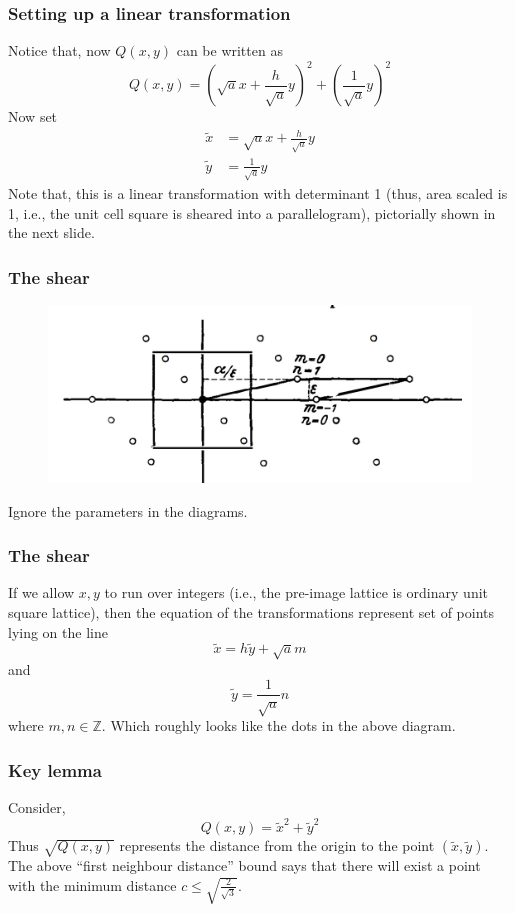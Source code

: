 \documentclass{beamer}
\begin{document}
    \begin{frame}
        \frametitle{Setting up a linear transformation}
        Notice that, now \(Q(x,y)\) can be written as \[Q(x,y) = \left(\sqrt{a}x + \frac{h}{\sqrt{a}}y\right)^2 + \left(\frac{1}{\sqrt{a}}y\right)^2\]
        Now set 
        \begin{align*}
            \tilde{x} &= \sqrt{a}x + \frac{h}{\sqrt{a}}y \\
            \tilde{y} &= \frac{1}{\sqrt{a}}y
        \end{align*}
        Note that, this is a linear transformation with determinant 1 (thus, area scaled is 1, i.e., the unit cell square is sheared into a parallelogram), pictorially shown in the next slide.
    \end{frame}

    \begin{frame}
        \frametitle{The shear}
        \begin{figure}
            \includegraphics[scale=0.29]{shear.png}
        \end{figure}
        Ignore the parameters in the diagrams.
    \end{frame}

    \begin{frame}
        \frametitle{The shear}
        If we allow \(x,y\) to run over integers (i.e., the pre-image lattice is ordinary unit square lattice), then the equation of the transformations represent set of points lying on the line \[\tilde{x} = h \tilde{y} + \sqrt{a}m\] and \[\tilde{y} = \frac{1}{\sqrt{a}}n\] where \(m, n \in \mathbb{Z}\). Which roughly looks like the dots in the above diagram. 
    \end{frame}
    \begin{frame}
        \frametitle{Key lemma}
        Consider, \[Q(x,y) = \tilde{x}^2 + \tilde{y}^2\] Thus \(\sqrt{Q(x,y)}\) represents the distance from the origin to the point \((\tilde{x},\tilde{y})\). The above ``first neighbour distance'' bound says that there will exist a point with the minimum distance \(c \leq \sqrt{\frac{2}{\sqrt{3}}}\).
    \end{frame}
\end{document}
